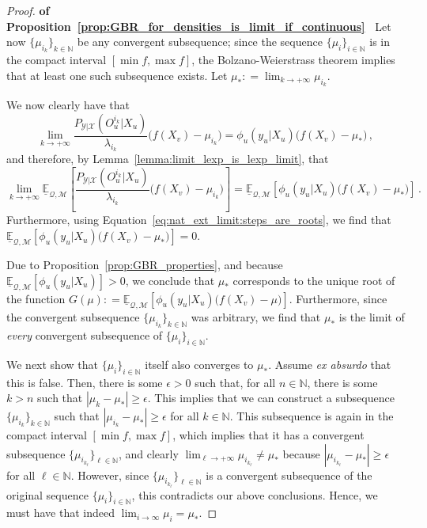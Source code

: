 \documentclass[3p]{elsarticle}
\newcommand{\nats}{\mathbb{N}}
\newcommand{\states}{\mathcal{X}}
\newcommand{\observs}{\mathcal{Y}}
\newcommand{\lexp}{\underline{\mathbb{E}}_{\rateset,\mathcal{M}}}
\newcommand{\rateset}{\mathcal{Q}}
\newcommand{\abs}[1]{\left\vert #1 \right\vert}
\newcommand{\coloneqq}{:\!=}
\begin{document}
\begin{proof}{\bf of Proposition~\ref{prop:GBR_for_densities_is_limit_if_continuous}~}
Let now $\{\mu_{i_k}\}_{k\in\nats}$ be any convergent subsequence; since the sequence $\{\mu_i\}_{i\in\nats}$ is in the compact interval $[\min f,\max f]$, the Bolzano-Weierstrass theorem implies that at least one such subsequence exists. Let $\mu_{*}\coloneqq \lim_{k\to+\infty}\mu_{i_k}$.

We now clearly have that
\begin{equation*}
\lim_{k\to+\infty} \frac{P_{\observs\vert\states}(O_u^{i_k}\vert X_u)}{\lambda_{i_k}}\bigl(f(X_v) - \mu_{i_k}\bigr) = \phi_u(y_u\vert X_u)\bigl(f(X_v) - \mu_{*}\bigr)\,,
\end{equation*}
and therefore, by Lemma~\ref{lemma:limit_lexp_is_lexp_limit}, that
\begin{equation*}
\lim_{k\to+\infty} \lexp\left[\frac{P_{\observs\vert\states}(O_u^{i_k}\vert X_u)}{\lambda_{i_k}}\bigl(f(X_v) - \mu_{i_k}\bigr)\right] = \lexp\left[\phi_u(y_u\vert X_u)\bigl(f(X_v) - \mu_{*}\bigr)\right]\,.
\end{equation*}
Furthermore, using Equation~\eqref{eq:nat_ext_limit:steps_are_roots}, we find that $\lexp\left[\phi_u(y_u\vert X_u)\bigl(f(X_v) - \mu_{*}\bigr)\right] = 0$.

Due to Proposition~\ref{prop:GBR_properties}, and because $\lexp[\phi_u(y_u\vert X_u)]>0$, we conclude that $\mu_{*}$ corresponds to the unique root of the function $G(\mu)\coloneqq \lexp\left[\phi_u(y_u\vert X_u)\bigl(f(X_v) - \mu\bigr)\right]$. Furthermore, since the convergent subsequence $\{\mu_{i_k}\}_{k\in\nats}$ was arbitrary, we find that $\mu_*$ is the limit of \emph{every} convergent subsequence of $\{\mu_i\}_{i\in\nats}$.

We next show that $\{\mu_i\}_{i\in\nats}$ itself also converges to $\mu_*$. Assume \emph{ex absurdo} that this is false. Then, there is some $\epsilon>0$ such that, for all $n\in\nats$, there is some $k>n$ such that $\abs{\mu_k - \mu_*} \geq \epsilon$. This implies that we can construct a subsequence $\{\mu_{i_k}\}_{k\in\nats}$ such that $\abs{\mu_{i_k}-\mu_*}\geq \epsilon$ for all $k\in\nats$. This subsequence is again in the compact interval $[\min f, \max f]$, which implies that it has a convergent subsequence $\{\mu_{i_{k_\ell}}\}_{\ell\in\nats}$, and clearly $\lim_{\ell\to+\infty}\mu_{i_{k_\ell}} \neq \mu_*$ because $\abs{\mu_{i_{k_\ell}} - \mu_*}\geq\epsilon$ for all $\ell\in\nats$. However, since $\{\mu_{i_{k_\ell}}\}_{\ell\in\nats}$ is a convergent subsequence of the original sequence $\{\mu_i\}_{i\in\nats}$, this contradicts our above conclusions. Hence, we must have that indeed $\lim_{i\to\infty}\mu_i=\mu_*$.


\end{proof}
\end{document}
